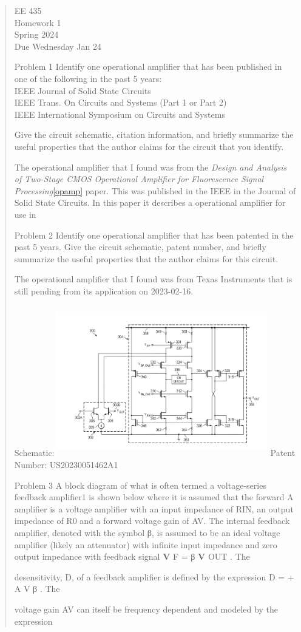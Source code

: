 \documentclass[10pt,a4paper]{article}
\author{}
\date{}
\begin{document}
\begin{quote}
EE 435\\
Homework 1\\
Spring 2024\\
Due Wednesday Jan 24

Problem 1 Identify one operational amplifier that has been published in
one of the following in the past 5 years:\\
IEEE Journal of Solid State Circuits\\
IEEE Trans. On Circuits and Systems (Part 1 or Part 2)\\
IEEE International Symposium on Circuits and Systems

Give the circuit schematic, citation information, and briefly summarize
the useful properties that the author claims for the circuit that you
identify.


The operational amplifier that I found was from the \textit{Design and Analysis of Two-Stage CMOS Operational Amplifier for Fluorescence Signal Processing}\ref{opamp} paper. This was published in the IEEE in the Journal of Solid State Circuits. In this paper it describes a operational amplifier for use in 


Problem 2 Identify one operational amplifier that has been patented in
the past 5 years. Give the circuit schematic, patent number, and briefly
summarize the useful properties that the author claims for this circuit.

The operational amplifier that I found was from Texas Instruments that is still pending from its application on 2023-02-16.



Schematic:
\includegraphics[width=3.61111in,height=2.58333in]{images/TIOpAmpSchematic.png}
Patent Number: US20230051462A1


Problem 3 A block diagram of what is often termed a voltage-series
feedback amplifier1 is shown below where it is assumed that the forward
A amplifier is a voltage amplifier with an input impedance of RIN, an
output impedance of R0 and a forward voltage gain of AV. The internal
feedback amplifier, denoted with the symbol β, is assumed to be an ideal
voltage amplifier (likely an attenuator) with infinite input impedance
and zero output impedance with feedback signal \textbf{V} F = β
\textbf{V} OUT . The

desensitivity, D, of a feedback amplifier is defined by the expression D
= + A V β . The

voltage gain AV can itself be frequency dependent and modeled by the
expression
\end{quote}
\end{document}
